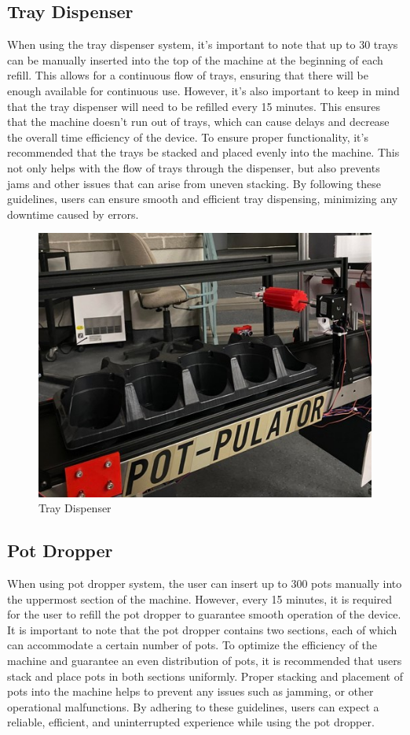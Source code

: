 \documentclass{article}
\begin{document}
\subsection{Tray Dispenser}
When using the tray dispenser system, it's important to note that up to 30 trays can be manually inserted into the top of the machine at the beginning of each refill. This allows for a continuous flow of trays, ensuring that there will be enough available for continuous use.
However, it's also important to keep in mind that the tray dispenser will need to be refilled every 15 minutes. This ensures that the machine doesn't run out of trays, which can cause delays and decrease the overall time efficiency of the device.
To ensure proper functionality, it's recommended that the trays be stacked and placed evenly into the machine. This not only helps with the flow of trays through the dispenser, but also prevents jams and other issues that can arise from uneven stacking.
By following these guidelines, users can ensure smooth and efficient tray dispensing, minimizing any downtime caused by errors.

\begin{figure}[H]
    \centering
    \includegraphics[width=\textwidth]{tray.jpg}
    \caption{Tray Dispenser}
    \label{fig:scope}
  \end{figure}
\newpage
\subsection{Pot Dropper}
When using pot dropper system, the user can insert up to 300 pots manually into the uppermost section of the machine. However, every 15 minutes, it is required for the user to refill the pot dropper to guarantee smooth operation of the device.
It is important to note that the pot dropper contains two sections, each of which can accommodate a certain number of pots. To optimize the efficiency of the machine and guarantee an even distribution of pots, it is recommended that users stack and place pots in both sections uniformly. Proper stacking and placement of pots into the machine helps to prevent any issues such as jamming, or other operational malfunctions.
By adhering to these guidelines, users can expect a reliable, efficient, and uninterrupted experience while using the pot dropper.
\end{document}
